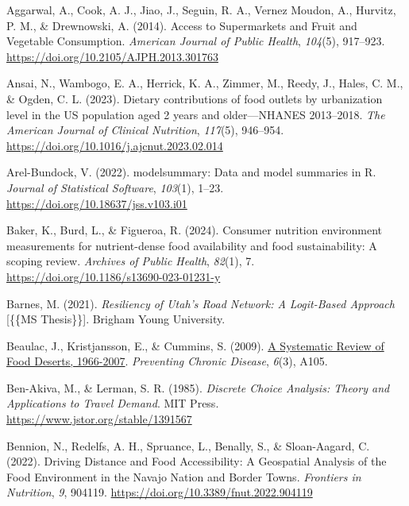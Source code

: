 \documentclass[
  letterpaper,
  number,
  review,
  3p]{elsarticle}
\newlength{\cslhangindent}
\newenvironment{CSLReferences}[2] %
 {\begin{list}{}{%
  \setlength{\itemindent}{0pt}
  \setlength{\leftmargin}{0pt}
  \setlength{\parsep}{0pt}
  \ifodd #1
   \setlength{\leftmargin}{\cslhangindent}
   \setlength{\itemindent}{-1\cslhangindent}
  \fi
  \setlength{\itemsep}{#2\baselineskip}}}
 {\end{list}}
\begin{document}

\label{refs}
\begin{CSLReferences}{1}{0}
Aggarwal, A., Cook, A. J., Jiao, J., Seguin, R. A., Vernez Moudon, A.,
Hurvitz, P. M., \& Drewnowski, A. (2014). Access to {Supermarkets} and
{Fruit} and {Vegetable Consumption}. \emph{American Journal of Public
Health}, \emph{104}(5), 917--923.
\url{https://doi.org/10.2105/AJPH.2013.301763}

Ansai, N., Wambogo, E. A., Herrick, K. A., Zimmer, M., Reedy, J., Hales,
C. M., \& Ogden, C. L. (2023). Dietary contributions of food outlets by
urbanization level in the {US} population aged 2 years and
older---{NHANES} 2013--2018. \emph{The American Journal of Clinical
Nutrition}, \emph{117}(5), 946--954.
\url{https://doi.org/10.1016/j.ajcnut.2023.02.014}

Arel-Bundock, V. (2022). {modelsummary}: Data and model summaries in
{R}. \emph{Journal of Statistical Software}, \emph{103}(1), 1--23.
\url{https://doi.org/10.18637/jss.v103.i01}

Baker, K., Burd, L., \& Figueroa, R. (2024). Consumer nutrition
environment measurements for nutrient-dense food availability and food
sustainability: A scoping review. \emph{Archives of Public Health},
\emph{82}(1), 7. \url{https://doi.org/10.1186/s13690-023-01231-y}

Barnes, M. (2021). \emph{Resiliency of {Utah}'s {Road Network}: {A
Logit-Based Approach}} {[}\{\{MS Thesis\}\}{]}. Brigham Young
University.

Beaulac, J., Kristjansson, E., \& Cummins, S. (2009).
\href{https://www.ncbi.nlm.nih.gov/pmc/articles/PMC2722409}{A
{Systematic Review} of {Food Deserts}, 1966-2007}. \emph{Preventing
Chronic Disease}, \emph{6}(3), A105.

Ben-Akiva, M., \& Lerman, S. R. (1985). \emph{Discrete {Choice
Analysis}: {Theory} and {Applications} to {Travel Demand}}. MIT Press.
\url{https://www.jstor.org/stable/1391567}

Bennion, N., Redelfs, A. H., Spruance, L., Benally, S., \& Sloan-Aagard,
C. (2022). Driving {Distance} and {Food Accessibility}: {A Geospatial
Analysis} of the {Food Environment} in the {Navajo Nation} and {Border
Towns}. \emph{Frontiers in Nutrition}, \emph{9}, 904119.
\url{https://doi.org/10.3389/fnut.2022.904119}


\end{CSLReferences}
\end{document}
